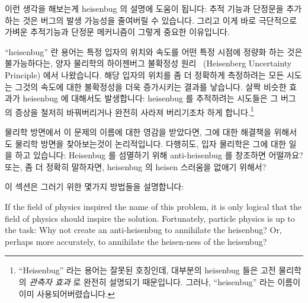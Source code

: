 이런 생각을 해보는게 heisenbug 의 설명에 도움이 됩니다:
추적 기능과 단정문을 추가하는 것은 버그의 발생 가능성을 줄여버릴 수 있습니다.
그리고 이게 바로 극단적으로 가벼운 추적기능과 단정문 메커니즘이 그렇게 중요한
이유입니다.

``heisenbug'' 란 용어는 특정 입자의 위치와 속도를 어떤 특정 시점에 정량화 하는
것은 불가능하다는, 양자 물리학의 하이젠버그 불확정성
원리~\cite{WeinerHeisenberg1927Uncertain} (Heisenberg Uncertainty Principle)
에서 나왔습니다.
해당 입자의 위치를 좀 더 정확하게 측정하려는 모든 시도는 그것의 속도에 대한
불확정성을 더욱 증가시키는 결과를 낳습니다.
살짝 비슷한 효과가 heisenbug 에 대해서도 발생합니다: heisenbug 를 추적하려는
시도들은 그 버그의 증상을 철저히 바꿔버리거나 완전히 사라져 버리기조차 하게
합니다.\footnote{
	``Heisenbug'' 라는 용어는 잘못된 호칭인데, 대부분의 heisenbug 들은 고전
	물리학의 \emph{관측자 효과} 로 완전히 설명되기 때문입니다.
	그러나, ``heisenbug'' 라는 이름이 이미 사용되어버렸습니다.}

물리학 방면에서 이 문제의 이름에 대한 영감을 받았다면, 그에 대한 해결책을
위해서도 물리학 방면을 찾아보는것이 논리적입니다.
다행히도, 입자 물리학은 그에 대한 일을 하고 있습니다:
Heisenbug 를 섬멸하기 위해 anti-heisenbug 를 창조하면 어떨까요?
또는, 좀 더 정확히 말하자면, heisenbug 의 heisen 스러움을 없애기 위해서?

이 섹션은 그러기 위한 몇가지 방법들을 설명합니다:
\iffalse

If the field of physics inspired the name of this problem, it is only
logical that the field of physics should inspire the solution.
Fortunately, particle physics is up to the task:
Why not create an anti-heisenbug to annihilate the heisenbug?
Or, perhaps more accurately, to annihilate the heisen-ness of
the heisenbug?

